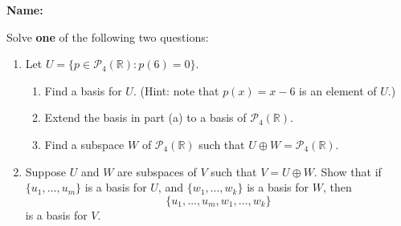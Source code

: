 \documentclass[12pt]{article}
\newcommand{\points}[1]{\marginpar{\hspace{24pt}[#1]}}
\newcommand{\R}{\mathbb{R}}
\begin{document}
\thispagestyle{fancy}
{\bf Name:}

\bigskip

Solve {\bf one} of the following two questions:
 \begin{enumerate}
 \item  Let $U = \{p\in \mathcal{P}_4(\R) : p(6)=0\}$.
\begin{enumerate}
 \item Find a basis for $U$. \points{2} (Hint: note that $p(x)=x-6$ is an element of $U$.)
 \item Extend the basis in part (a) to a basis of $\mathcal{P}_4(\R)$.\points{4}
 \item Find a subspace $W$ of $\mathcal{P}_4(\R)$ such that $U\oplus W = \mathcal{P}_4(\R)$. \points{4}
\end{enumerate}
\item Suppose $U$ and $W$ are subspaces of $V$ such that $V=U\oplus W$. Show that if $\{u_1,\ldots, u_m\}$ is a basis for $U$, and $\{w_1,\ldots, w_k\}$ is a basis for $W$, then \points{10}
\[
 \{u_1,\ldots, u_m,w_1,\ldots, w_k\}
\]
is a basis for $V$.
 \end{enumerate}
\end{document}
